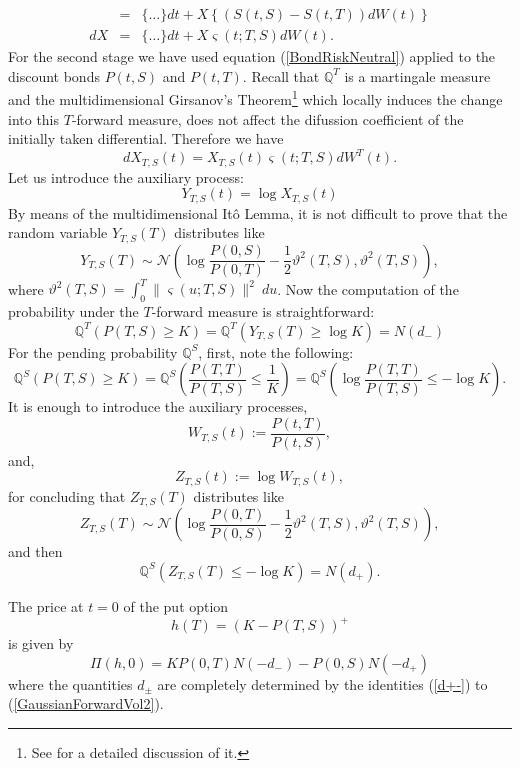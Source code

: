 \begin{demo}
\begin{equation}
\begin{array}{rcl}
&=& \{ \dots \} dt + X\left\{ \left(S(t,S)-S(t,T)\right)dW(t)\right\}\\
dX&=& \{ \dots \} dt+X\varsigma(t;T,S)dW(t).
\end{array}
\end{equation}
For the second stage we have used equation (\ref{BondRiskNeutral})
applied to the discount bonds $P(t,S)$ and $P(t,T)$. Recall that
$\mathbb{Q}^T$ is a martingale measure and the multidimensional
Girsanov's Theorem\footnote{See \cite{MR:2004} for a detailed
  discussion of it.}   
which locally induces the change into this $T$-forward measure, does
not affect the difussion coefficient of the initially taken
differential. Therefore we have 
$$
dX_{T,S}(t)=X_{T,S}(t)\varsigma(t;T,S)dW^T(t).
$$
Let us introduce the auxiliary process:
$$
Y_{T,S}(t)=\log X_{T,S}(t)
$$
By means of the multidimensional It\^o Lemma, it is not difficult to
prove that the random variable $Y_{T,S}(T)$ distributes like
$$
Y_{T,S}(T) \sim\mathcal{N}\left( \log \frac{P(0,S)}{P(0,T)}-\frac{1}{2}\vartheta^2(T,S), \vartheta^2(T,S)\right),
$$
where $\vartheta^2(T,S)=\int_0^T \| \varsigma(u;T,S) \|^2 \:du$. Now
the computation of the probability under the $T$-forward measure is
straightforward:
$$
\mathbb{Q}^T(P(T,S)\geq K)=\mathbb{Q}^T(Y_{T,S}(T)\geq \log K)=N(d_-)
$$
For the pending probability $\mathbb{Q}^S$, first, note the following:
$$
\mathbb{Q}^S(P(T,S)\geq K)=\mathbb{Q}^S\left(\frac{P(T,T)}{P(T,S)}\leq
  \frac{1}{K}\right) =\mathbb{Q}^S\left(\log\frac{P(T,T)}{P(T,S)}\leq
  -\log K\right).$$
It is enough to introduce the auxiliary processes,
$$
W_{T,S}(t):=\frac{P(t,T)}{P(t,S)},
$$
and,
$$
Z_{T,S}(t):=\log W_{T,S}(t),
$$
for concluding that $Z_{T,S}(T)$ distributes like
$$
Z_{T,S}(T) \sim\mathcal{N}\left( \log \frac{P(0,T)}{P(0,S)}-\frac{1}{2}\vartheta^2(T,S), \vartheta^2(T,S)\right),
$$
and then
$$
\mathbb{Q}^S(Z_{T,S}(T)\leq -\log K)=N(d_+).
$$
\end{demo}
\begin{corol}
The price at $t=0$ of the put option
$$
h(T)=(K-P(T,S))^+
$$
is given by
\begin{equation}
\label{GaussianForwardPut}
\Pi(h,0)=K P(0,T) N(-d_-)-P(0,S) N(-d_+)
\end{equation}
where the quantities $d_{\pm}$ are completely determined by the identities (\ref{d+-}) to (\ref{GaussianForwardVol2}). 
\end{corol}
